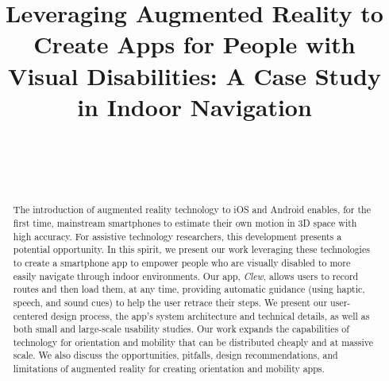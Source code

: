\documentclass[chi_draft]{sigchi}
\def\plaintitle{Leveraging Augmented Reality to Create Apps for People with Visual Disabilities: A Case Study in Indoor Navigation}
\begin{document}
\title{\plaintitle}

\author{%
  \\
  \\
  \\
}

\maketitle

\begin{abstract}
The introduction of augmented reality technology to iOS and Android enables, for the first time, mainstream smartphones to estimate their own motion in 3D space with high accuracy.  For assistive technology researchers, this development presents a potential opportunity.  In this spirit, we present our work leveraging these technologies to create a smartphone app to empower people who are visually disabled to more easily navigate through indoor environments.  Our app, \emph{Clew}, allows users to record routes and then load them, at any time, providing automatic guidance (using haptic, speech, and sound cues) to help the user retrace their steps.  We present our user-centered design process, the app's system architecture and technical details, as well as both small and large-scale usability studies.  Our work expands the capabilities of technology for orientation and mobility that can be distributed cheaply and at massive scale.  We also discuss the opportunities, pitfalls, design recommendations, and limitations of augmented reality for creating orientation and mobility apps.
\end{abstract}

\end{document}
